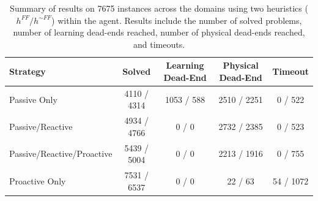 \documentclass[letterpaper]{article}
\begin{document}
\begin{table}\centering\begin{tabular}{|l|cccc|}\hline																	
Strategy	&	Solved			&	Learning Dead-End			&	Physical Dead-End			&	Timeout		
\\\hline\hline Passive Only	&	4110	/	4314	&	1053	/	588	&	2510	/	2251	&	0	/	522	\\
Passive/Reactive	&	4934	/	4766	&	0	/	0	&	2732	/	2385	&	0	/	523	\\
Passive/Reactive/Proactive	&	5439	/	5004	&	0	/	0	&	2213	/	1916	&	0	/
755	\\ Proactive Only	&	7531	/	6537	&	0	/	0	&	22	/	63	&	54	/	1072	\\\hline
\end{tabular}	\caption{\label{tab:t1} Summary of results on 7675 instances
across the domains using two heuristics ($h^{FF}/h^{\sim FF}$) within the agent. 
Results include the number of solved problems, number of learning dead-ends reached, number of physical dead-ends reached, and timeouts.}	\end{table}
\end{document}
